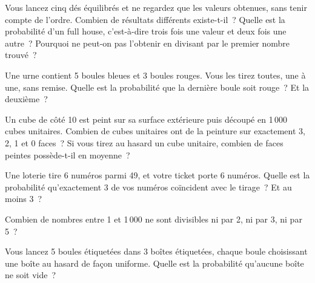\begin{question}\label{iq:iv1:counting-and-symmetry:6}
Vous lancez cinq dés équilibrés et ne regardez que les valeurs obtenues, sans tenir compte de l'ordre. Combien de résultats différents existe-t-il~? Quelle est la probabilité d'un full house, c'est-à-dire trois fois une valeur et deux fois une autre~? Pourquoi ne peut-on pas l'obtenir en divisant par le premier nombre trouvé~?
\end{question}

\begin{question}\label{iq:iv1:counting-and-symmetry:7}
Une urne contient 5 boules bleues et 3 boules rouges. Vous les tirez toutes, une à une, sans remise. Quelle est la probabilité que la dernière boule soit rouge~? Et la deuxième~?
\end{question}

\begin{question}\label{iq:iv1:counting-and-symmetry:8}
Un cube de côté 10 est peint sur sa surface extérieure puis découpé en 1\,000 cubes unitaires. Combien de cubes unitaires ont de la peinture sur exactement 3, 2, 1 et 0 faces~? Si vous tirez au hasard un cube unitaire, combien de faces peintes possède-t-il en moyenne~?
\end{question}

\begin{question}\label{iq:iv1:counting-and-symmetry:9}
Une loterie tire 6 numéros parmi 49, et votre ticket porte 6 numéros. Quelle est la probabilité qu'exactement 3 de vos numéros coïncident avec le tirage~? Et au moins 3~?
\end{question}

\begin{question}\label{iq:iv1:counting-and-symmetry:10}
Combien de nombres entre 1 et 1\,000 ne sont divisibles ni par 2, ni par 3, ni par 5~?
\end{question}

\begin{question}\label{iq:iv1:counting-and-symmetry:11}
Vous lancez 5 boules étiquetées dans 3 boîtes étiquetées, chaque boule choisissant une boîte au hasard de façon uniforme. Quelle est la probabilité qu'aucune boîte ne soit vide~?
\end{question}

